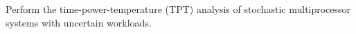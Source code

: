 Perform the time-power-temperature (TPT) analysis of stochastic multiprocessor systems with uncertain workloads.
